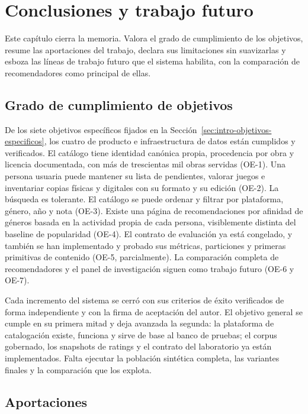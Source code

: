 \chapter{Conclusiones y trabajo futuro}\label{cap:conclusiones}

Este capítulo cierra la memoria. Valora el grado de cumplimiento de los objetivos, resume
las aportaciones del trabajo, declara sus limitaciones sin suavizarlas y esboza las líneas de
trabajo futuro que el sistema habilita, con la comparación de recomendadores como principal
de ellas.

\section{Grado de cumplimiento de objetivos}\label{sec:conc-objetivos}

De los siete objetivos específicos fijados en la Sección~\ref{sec:intro-objetivos-especificos},
los cuatro de producto e infraestructura de datos están cumplidos y verificados. El catálogo
tiene identidad canónica propia, procedencia por obra y licencia documentada, con más de
trescientas mil obras servidas (OE-1). Una persona usuaria puede mantener su lista de
pendientes, valorar juegos e inventariar copias físicas y digitales con su formato y su
edición (OE-2). La búsqueda es tolerante. El catálogo se puede ordenar y filtrar por
plataforma, género, año y nota (OE-3). Existe una página de recomendaciones por afinidad de
géneros basada en la actividad propia de cada persona, visiblemente distinta del baseline de
popularidad (OE-4). El contrato de evaluación ya está congelado, y también se han
implementado y probado sus métricas, particiones y primeras primitivas de contenido (OE-5,
parcialmente). La comparación completa de recomendadores y el panel de investigación siguen
como trabajo futuro (OE-6 y OE-7).

Cada incremento del sistema se cerró con sus criterios de éxito verificados de forma
independiente y con la firma de aceptación del autor. El objetivo general se cumple en su
primera mitad y deja avanzada la segunda: la plataforma de catalogación existe, funciona y
sirve de base al banco de pruebas; el corpus gobernado, los snapshots de ratings y el
contrato del laboratorio ya están implementados. Falta ejecutar la población sintética
completa, las variantes finales y la comparación que los explota.

\section{Aportaciones}\label{sec:conc-aportaciones}

